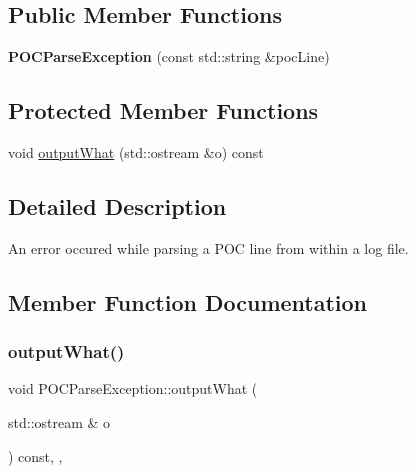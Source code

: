 \subsection*{Public Member Functions}
\begin{DoxyCompactItemize}
\item 
\mbox{\label{class_p_o_c_parse_exception_a9e0a2148682a5458be2cefef2e2f02ed}} 
{\bfseries P\+O\+C\+Parse\+Exception} (const std\+::string \&poc\+Line)
\end{DoxyCompactItemize}
\subsection*{Protected Member Functions}
\begin{DoxyCompactItemize}
\item 
void \hyperlink{class_p_o_c_parse_exception_a10ddedc5f13b259d4eeda78273e2ad4a}{output\+What} (std\+::ostream \&o) const
\end{DoxyCompactItemize}


\subsection{Detailed Description}
An error occured while parsing a P\+OC line from within a log file. 

\subsection{Member Function Documentation}
\mbox{\label{class_p_o_c_parse_exception_a10ddedc5f13b259d4eeda78273e2ad4a}} 
\subsubsection{\texorpdfstring{output\+What()}{outputWhat()}}
{\footnotesize\ttfamily void P\+O\+C\+Parse\+Exception\+::output\+What (\begin{DoxyParamCaption}\item[{std\+::ostream \&}]{o }\end{DoxyParamCaption}) const\hspace{0.3cm}{\ttfamily [inline]}, {\ttfamily [protected]}, {\ttfamily [virtual]}}

